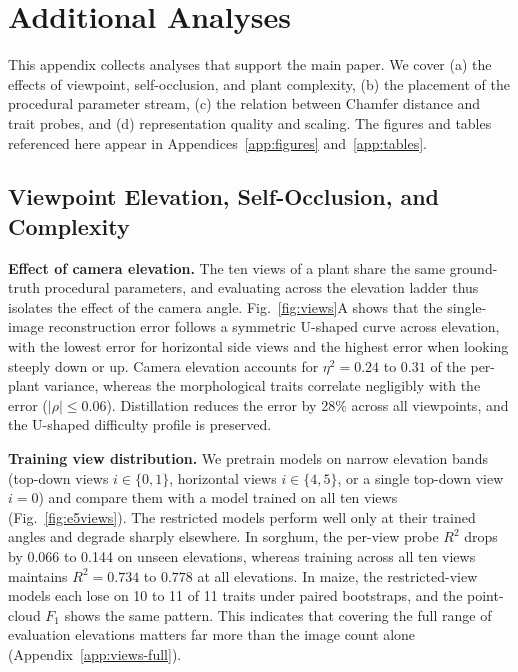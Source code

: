 \documentclass[10pt,twocolumn,letterpaper]{article}
\begin{document}
\section{Additional Analyses}
\label{app:analyses}

This appendix collects analyses that support the main paper. We cover (a) the effects of viewpoint, self-occlusion, and plant complexity, (b) the placement of the procedural parameter stream, (c) the relation between Chamfer distance and trait probes, and (d) representation quality and scaling. The figures and tables referenced here appear in Appendices~\ref{app:figures} and~\ref{app:tables}.

\subsection{Viewpoint Elevation, Self-Occlusion, and Complexity}
\label{sec:regime2}\label{sec:exp-regime2}

\noindent\textbf{Effect of camera elevation.}
The ten views of a plant share the same ground-truth procedural parameters, and evaluating across the elevation ladder thus isolates the effect of the camera angle. Fig.~\ref{fig:views}A shows that the single-image reconstruction error follows a symmetric U-shaped curve across elevation, with the lowest error for horizontal side views and the highest error when looking steeply down or up. Camera elevation accounts for $\eta^2 = 0.24$ to $0.31$ of the per-plant variance, whereas the morphological traits correlate negligibly with the error ($|\rho| \le 0.06$). Distillation reduces the error by 28\% across all viewpoints, and the U-shaped difficulty profile is preserved.

\noindent\textbf{Training view distribution.}
We pretrain models on narrow elevation bands (top-down views $i \in \{0,1\}$, horizontal views $i \in \{4,5\}$, or a single top-down view $i=0$) and compare them with a model trained on all ten views (Fig.~\ref{fig:e5views}). The restricted models perform well only at their trained angles and degrade sharply elsewhere. In sorghum, the per-view probe $R^2$ drops by 0.066 to 0.144 on unseen elevations, whereas training across all ten views maintains $R^2 = 0.734$ to $0.778$ at all elevations. In maize, the restricted-view models each lose on 10 to 11 of 11 traits under paired bootstraps, and the point-cloud $F_1$ shows the same pattern. This indicates that covering the full range of evaluation elevations matters far more than the image count alone (Appendix~\ref{app:views-full}).
\end{document}
